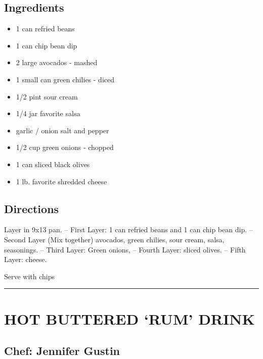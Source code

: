 \documentclass[
]{book}
\providecommand{\tightlist}{%
  \setlength{\itemsep}{0pt}\setlength{\parskip}{0pt}}
\begin{document}
\hypertarget{ingredients-5}{%
\subsection*{Ingredients}\label{ingredients-5}}


\begin{itemize}
\tightlist
\item
  1 can refried beans
\item
  1 can chip bean dip
\item
  2 large avocados - mashed
\item
  1 small can green chilies - diced
\item
  1/2 pint sour cream
\item
  1/4 jar favorite salsa
\item
  garlic / onion salt and pepper
\item
  1/2 cup green onions - chopped
\item
  1 can sliced black olives
\item
  1 lb. favorite shredded cheese
\end{itemize}

\hypertarget{directions-5}{%
\subsection*{Directions}\label{directions-5}}


Layer in 9x13 pan.
-- First Layer: 1 can refried beans and 1 can chip bean dip.
-- Second Layer (Mix together) avocados, green chilies, sour cream, salsa, seasonings.
-- Third Layer: Green onions,
-- Fourth Layer: sliced olives.
-- Fifth Layer: cheese.

Serve with chips

\begin{center}\rule{0.5\linewidth}{0.5pt}\end{center}

\hypertarget{hot-buttered-rum-drink}{%
\section*{HOT BUTTERED `RUM' DRINK}\label{hot-buttered-rum-drink}}


\hypertarget{chef-jennifer-gustin-1}{%
\subsection*{Chef: Jennifer Gustin}\label{chef-jennifer-gustin-1}}
\end{document}
